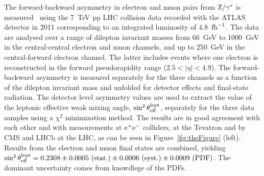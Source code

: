 \documentclass{blois}
\begin{document}
The forward-backward asymmetry in electron and muon pairs from ${\rm Z}/\gamma^*$
is measured~\cite{bib:ATLAS-fb-asymmetry} using the 7~TeV pp LHC collision data
recorded with the ATLAS detector in 2011 corresponding to an integrated luminosity
of 4.8~${\rm fb}^{-1}$. The data are analysed over a range of dilepton invariant
masses from 66~GeV to 1000~GeV in the central-central electron and muon channels,
and up to 250~GeV in the central-forward electron channel. The latter includes
events where one electron is reconstructed in the forward pseudorapidity range
($2.5 < |\eta| < 4.9$). The forward-backward asymmetry is measured separately
for the three channels as a function of the dilepton invariant mass and unfolded
for detector effects and final-state radiation. The detector level asymmetry
values are used to extract the value of the leptonic effective weak mixing angle,
$\sin^2\theta_{\rm eff}^{\rm lept}$, separately for the three data samples using
a $\chi^2$ minimization method. The results are in good agreement with each other
and with measurements at ${\rm e}^+{\rm e}^-$ colliders, at the Tevatron and by
CMS and LHCb at the LHC, as can be seen in Figure~\ref{fig:theFigure} (left). Results
from the electron and muon final states are combined, yielding
$\sin^2\theta_{\rm eff}^{\rm lept} = 0.2308 \pm 0.0005~({\rm stat.}) \pm 0.0006~({\rm syst.}) \pm 0.0009~({\rm PDF})$.
The dominant uncertainty comes from knowdlege of the PDFs.
%
\end{document}

